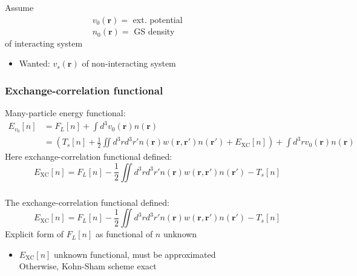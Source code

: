 \documentclass[compress]{beamer}
\begin{document}
\frame
{ 
  \frametitle{}
  \begin{small}
    {\scriptsize
      Assume \\
      $\qquad \qquad \qquad \qquad \qquad $ $v_{0}(\mathbf{r}) =$ ext. potential \\
      $\qquad \qquad \qquad \qquad \qquad $ $n_{0}(\mathbf{r}) =$ GS density \\
      of \alert{interacting} system 
      \begin{itemize}
      \item Wanted:  $v_{s}(\mathbf{r})$ of \alert{non-interacting} system
      \end{itemize}
    }
  \end{small}
}

\frame
{ 
  \frametitle{Exchange-correlation functional}
  \begin{small}
    {\scriptsize
      Many-particle energy functional:
      \begin{align}
        E_{v_{0}}[n]&=F_{L}[n]+\int d^{3}v_{0}(\mathbf{r})n(\mathbf{r}) \nonumber \\
        &=\left(T_{s}[n]+\frac{1}{2}\iint d^{3}r d^{3}r' n(\mathbf{r})w(\mathbf{r},\mathbf{r}')n(\mathbf{r}')+E_{\mathrm{XC}}[n]\right) + \int d^{3}r v_{0}(\mathbf{r})n(\mathbf{r}) \nonumber 
      \end{align}
      Here \alert{exchange-correlation functional} defined: 
      \begin{equation}
        E_{\mathrm{XC}}[n]=F_{L}[n]-\frac{1}{2}\iint d^{3}r d^{3}r' n(\mathbf{r})w(\mathbf{r},\mathbf{r}')n(\mathbf{r}')-T_{s}[n] \nonumber
      \end{equation}
    }
  \end{small}
}

\frame
{ 
  \frametitle{}
  \begin{small}
    {\scriptsize
      The exchange-correlation functional defined: 
      \begin{equation}
        E_{\mathrm{XC}}[n]=F_{L}[n]-\frac{1}{2}\iint d^{3}r d^{3}r' n(\mathbf{r})w(\mathbf{r},\mathbf{r}')n(\mathbf{r}')-T_{s}[n] \nonumber
      \end{equation}
      \vspace{5mm}
      \alert{Explicit form} of $F_{L}[n]$ as functional of $n$ \alert{unknown}
      \begin{itemize}
        \item $E_{\mathrm{XC}}[n]$ unknown functional, must be approximated \\
          Otherwise, Kohn-Sham scheme exact 
      \end{itemize}
    }
  \end{small}
}
\end{document}
